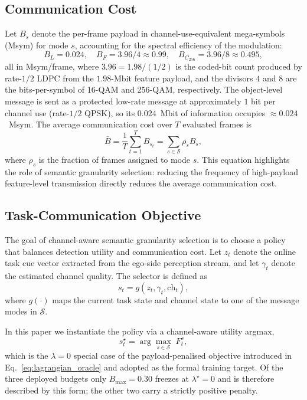 \documentclass[journal]{IEEEtran}
\begin{document}
\subsection{Communication Cost}

Let $B_s$ denote the per-frame payload in channel-use-equivalent mega-symbols (Msym) for mode $s$, accounting for the spectral efficiency of the modulation:
\begin{equation}
B_L = 0.024, \quad B_{F} = 3.96/4 \approx 0.99, \quad B_{C_{256}} = 3.96/8 \approx 0.495,
\label{eq:payload}
\end{equation}
all in Msym/frame, where $3.96 = 1.98/(1/2)$ is the coded-bit count produced by rate-$1/2$ LDPC from the $1.98$-Mbit feature payload, and the divisors $4$ and $8$ are the bits-per-symbol of 16-QAM and 256-QAM, respectively. The object-level message is sent as a protected low-rate message at approximately $1$ bit per channel use (rate-$1/2$ QPSK), so its $0.024$~Mbit of information occupies ${\approx}0.024$~Msym. The average communication cost over $T$ evaluated frames is
\begin{equation}
\bar{B} = \frac{1}{T}\sum_{t=1}^{T} B_{s_t} = \sum_{s \in \mathcal{S}} \rho_s B_s,
\end{equation}
where $\rho_s$ is the fraction of frames assigned to mode $s$. This equation highlights the role of semantic granularity selection: reducing the frequency of high-payload feature-level transmission directly reduces the average communication cost.

\subsection{Task-Communication Objective}

The goal of channel-aware semantic granularity selection is to choose a policy that balances detection utility and communication cost. Let $z_t$ denote the online task cue vector extracted from the ego-side perception stream, and let $\gamma_t$ denote the estimated channel quality. The selector is defined as
\begin{equation}
s_t = g(z_t, \gamma_t, \text{ch}_t),
\label{eq:selector}
\end{equation}
where $g(\cdot)$ maps the current task state and channel state to one of the message modes in $\mathcal{S}$.

In this paper we instantiate the policy via a channel-aware utility argmax,
\begin{equation}
s_t^\star = \arg\max_{s \in \mathcal{S}}\; F_t^{s},
\label{eq:oracle}
\end{equation}
which is the $\lambda=0$ special case of the payload-penalised objective introduced in Eq.~\eqref{eq:lagrangian_oracle} and adopted as the formal training target. Of the three deployed budgets only $B_{\max}=0.30$ freezes at $\lambda^\star=0$ and is therefore described by this form; the other two carry a strictly positive penalty.
\end{document}
